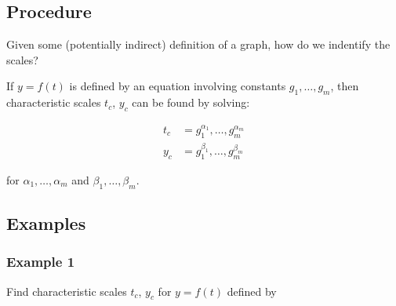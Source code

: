 \documentclass[12pt,twoside]{article}
\begin{document}
\subsection{Procedure}
Given some (potentially indirect) definition of a graph, how do we indentify the
scales?

If $y=f(t)$ is defined by an equation involving constants $g_1, \ldots, g_m$,
then characteristic scales $t_c$, $y_c$ can be found by solving:

\begin{equation}
  \begin{aligned}
    t_c &= g_1^{\alpha_1}, \ldots, g_m^{\alpha_m} \\
    y_c &= g_1^{\beta_1}, \ldots, g_m^{\beta_m}
  \end{aligned}
\end{equation}

for $\alpha_1, \ldots, \alpha_m$ and $\beta_1, \ldots, \beta_m$.

\subsection{Examples}
\subsubsection{Example 1}

Find characteristic scales $t_c$, $y_c$ for $y=f(t)$ defined by
\end{document}

